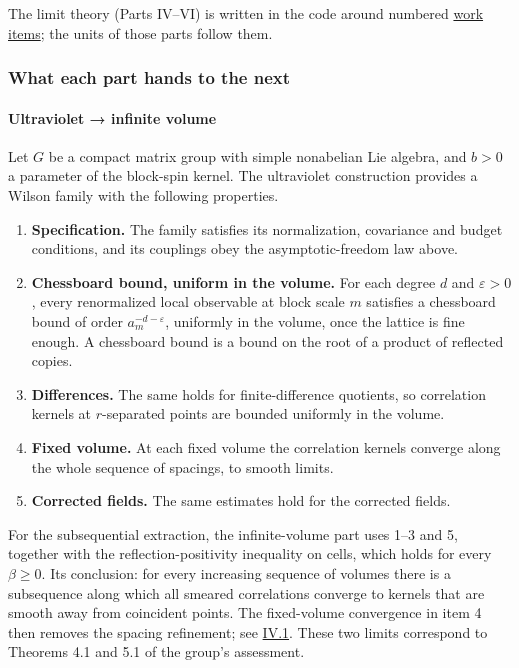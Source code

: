 \documentclass[
  letterpaper,
  11pt]{article}
\providecommand{\tightlist}{%
  \setlength{\itemsep}{0pt}\setlength{\parskip}{0pt}}
\begin{document}
The limit theory (Parts IV--VI) is written in the code around numbered
\href{https://github.com/scottnarmstrong/yang-mills-informalization/blob/main/outline/work-items.md}{work
items}; the units of those parts follow them.

\subsubsection{What each part hands to the
next}\label{what-each-part-hands-to-the-next}

\paragraph{Ultraviolet → infinite
volume}\label{ultraviolet-infinite-volume}

Let \(G\) be a compact matrix group with simple nonabelian Lie algebra,
and \(b>0\) a parameter of the block-spin kernel. The ultraviolet
construction provides a Wilson family with the following properties.

\begin{enumerate}
\def\labelenumi{\arabic{enumi}.}
\tightlist
\item
  \textbf{Specification.} The family satisfies its normalization,
  covariance and budget conditions, and its couplings obey the
  asymptotic-freedom law above.
\item
  \textbf{Chessboard bound, uniform in the volume.} For each degree
  \(d\) and \(\varepsilon>0\), every renormalized local observable at
  block scale \(m\) satisfies a chessboard bound of order
  \(a_m^{-d-\varepsilon}\), uniformly in the volume, once the lattice is
  fine enough. A chessboard bound is a bound on the root of a product of
  reflected copies.
\item
  \textbf{Differences.} The same holds for finite-difference quotients,
  so correlation kernels at \(r\)-separated points are bounded uniformly
  in the volume.
\item
  \textbf{Fixed volume.} At each fixed volume the correlation kernels
  converge along the whole sequence of spacings, to smooth limits.
\item
  \textbf{Corrected fields.} The same estimates hold for the corrected
  fields.
\end{enumerate}

For the subsequential extraction, the infinite-volume part uses 1--3 and
5, together with the reflection-positivity inequality on cells, which
holds for every \(\beta\ge0\). Its conclusion: for every increasing
sequence of volumes there is a subsequence along which all smeared
correlations converge to kernels that are smooth away from coincident
points. The fixed-volume convergence in item 4 then removes the spacing
refinement; see
\href{https://github.com/scottnarmstrong/yang-mills-informalization/blob/main/outline/units/IV-1.md}{IV.1}.
These two limits correspond to Theorems 4.1 and 5.1 of the group's
assessment.
\end{document}
